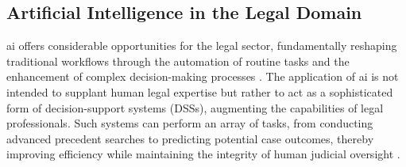 
\subsection{Artificial Intelligence in the Legal Domain}
\label{sec:background:ai4legal}

\ac{ai} offers considerable opportunities for the legal sector, fundamentally reshaping traditional workflows through the automation of routine tasks and the enhancement of complex decision-making processes \cite{juliahb2024}. The application of \ac{ai} is not intended to supplant human legal expertise but rather to act as a sophisticated form of decision-support systems (DSSs), augmenting the capabilities of legal professionals. Such systems can perform an array of tasks, from conducting advanced precedent searches to predicting potential case outcomes, thereby improving efficiency while maintaining the integrity of human judicial oversight \cite{juliahb2024}.

